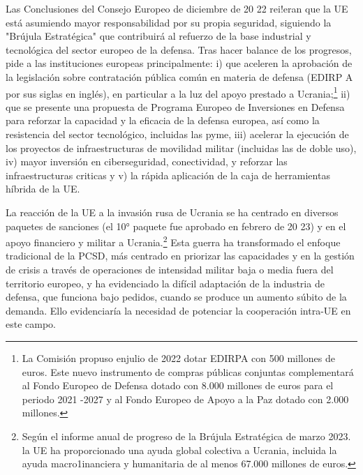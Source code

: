 \documentclass[10pt,a4paper]{article}
\begin{document}
Las Conclusiones del Consejo Europeo de diciembre de 20 22 rei!eran que la UE está asumiendo mayor responsabilidad por su propia seguridad, siguiendo la "Brújula Estratégica" que contribuirá al refuerzo de la base industrial y tecnológica del sector europeo de la defensa. Tras hacer balance de los progresos, pide a las instituciones europeas principalmente: i) que aceleren la aprobación de la legislación sobre contratación pública común en materia de defensa (EDIRP A por sus siglas en inglés), en particular a la luz del apoyo prestado a Ucrania;\footnote{%
    La Comisión propuso enjulio de 2022 dotar EDIRPA con 500 millones de euros. Este nuevo instrumento de compras públicas conjuntas complementará al Fondo Europeo de Defensa dotado con 8.000 millones de euros para el periodo 2021 -2027 y al Fondo Europeo de Apoyo a la Paz dotado con 2.000 millones.
} ii) que se presente una propuesta de Programa Europeo de Inversiones en Defensa para reforzar la capacidad y la eficacia de la defensa europea, así como la resistencia del sector tecnológico, incluidas las pyme, iii) acelerar la ejecución de los proyectos de infraestructuras de movilidad militar (incluidas las de doble uso), iv) mayor inversión en ciberseguridad, conectividad, y reforzar las infraestructuras criticas y v) la rápida aplicación de la caja de herramientas híbrida de la UE.

La reacción de la UE a la invasión rusa de Ucrania se ha centrado en diversos paquetes de sanciones (el 10° paquete fue aprobado en febrero de 20 23) y en el apoyo financiero y militar a Ucrania.\footnote{%
    Según el informe anual de progreso de la Brújula Estratégica de marzo 2023. la UE ha proporcionado una ayuda global colectiva a Ucrania, incluida la ayuda macro1inanciera y humanitaria de al menos 67.000 millones de euros.
} Esta guerra ha transformado el enfoque tradicional de la PCSD, más centrado en priorizar las capacidades y en la gestión de crisis a través de operaciones de intensidad militar baja o media fuera del territorio europeo, y ha evidenciado la difícil adaptación de la industria de defensa, que funciona bajo pedidos, cuando se produce un aumento súbito de la demanda. Ello evidenciaría la necesidad de potenciar la cooperación intra-UE en este campo.
\end{document}
